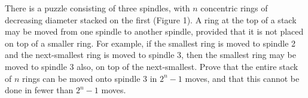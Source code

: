 \documentclass[12pt,letterpaper]{hmcpset}
\begin{document}
\begin{problem}[2.26]
    There is a puzzle consisting of three spindles, with \(n\) concentric rings of decreasing diameter stacked on the first (Figure 1). A ring at the top of a stack may be moved from one spindle to another spindle, provided that it is not placed on top of a smaller ring. For example, if the smallest ring is moved to spindle 2 and the next-smallest ring is moved to spindle 3, then the smallest ring may be moved to spindle 3 also, on top of the next-smallest. Prove that the entire stack of \(n\) rings can be moved onto spindle 3 in \(2^n-1\) moves, and that this cannot be done in fewer than \(2^n-1\) moves.
\end{problem}

\begin{solution}

\end{solution}
\end{document}
